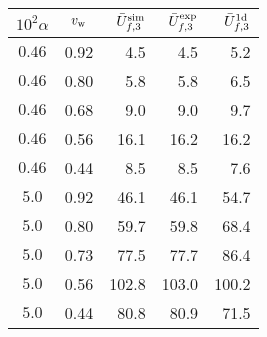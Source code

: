 \begin{tabular}{cc | rrr }
\hline\hline
$10^2\alpha$ & $v_{\rm w}$ & $\bar{U}_{f,3}^{\rm sim}$ & $\bar{U}_{f,3}^{\rm exp}$ & $\bar{U}_{f,3}^{\rm 1d}$ \\ 
\hline
$ 0.46 $ & 0.92 &  4.5 &  4.5 &  5.2 \\ 
$ 0.46 $ & 0.80 &  5.8 &  5.8 &  6.5 \\ 
$ 0.46 $ & 0.68 &  9.0 &  9.0 &  9.7 \\ 
$ 0.46 $ & 0.56 & 16.1 & 16.2 & 16.2 \\ 
$ 0.46 $ & 0.44 &  8.5 &  8.5 &  7.6 \\ 
$ 5.0 $ & 0.92 & 46.1 & 46.1 & 54.7 \\ 
$ 5.0 $ & 0.80 & 59.7 & 59.8 & 68.4 \\ 
$ 5.0 $ & 0.73 & 77.5 & 77.7 & 86.4 \\ 
$ 5.0 $ & 0.56 & 102.8 & 103.0 & 100.2 \\ 
$ 5.0 $ & 0.44 & 80.8 & 80.9 & 71.5 \\ 
\hline\hline
\end{tabular}
